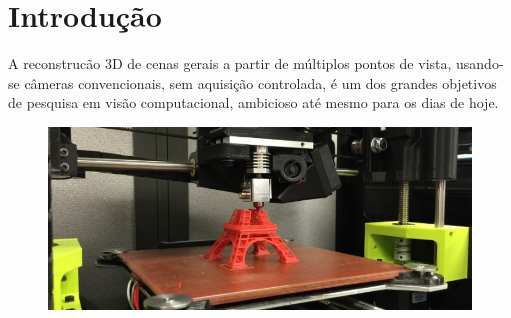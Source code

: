 \documentclass[table, usenames, svgnames, xcolor=dvipsnames]{beamer}
\begin{document}

\begin{frame}

	\footnotesize{ \tableofcontents[hideallsubsections] }
\end{frame}


\section{Introdução}
\begin{frame} 
	\begin{center}
		A reconstrucão 3D de cenas gerais a partir de múltiplos pontos de vista, usando-se câmeras convencionais, sem aquisição controlada, é um dos grandes objetivos de pesquisa em visão computacional, ambicioso até mesmo para os dias de hoje.
	\end{center}
\end{frame}

\begin{frame} 
	\begin{figure}[!h]
		\centering
		\includegraphics[width=1\linewidth]{figs/impressora-3d-capa.jpg}
	\end{figure}
\end{frame}
\end{document}
